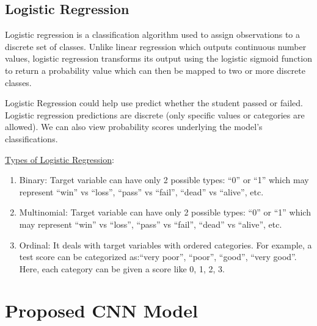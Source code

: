    
\subsection{Logistic Regression}

  Logistic regression is a classification algorithm used to assign observations to a discrete set of classes. Unlike linear regression which outputs continuous number values, logistic regression transforms its output using the logistic sigmoid function to return a probability value which can then be mapped to two or more discrete classes.
  
  Logistic Regression could help use predict whether the student passed or failed. Logistic regression predictions are discrete (only specific values or categories are allowed). We can also view probability scores underlying the model’s classifications.
  
       \underline{Types of Logistic Regression}:
       \begin{enumerate}
           \item Binary: Target variable can have only 2 possible types: “0” or “1” which may represent “win” vs “loss”, “pass” vs “fail”, “dead” vs “alive”, etc.
           \item Multinomial: Target variable can have only 2 possible types: “0” or “1” which may represent “win” vs “loss”, “pass” vs “fail”, “dead” vs “alive”, etc.
           \item Ordinal: It deals with target variables with ordered categories. For example, a test score can be categorized as:“very poor”, “poor”, “good”, “very good”. Here, each category can be given a score like 0, 1, 2, 3.
       \end{enumerate}
       
\newpage
\section{Proposed CNN Model}

